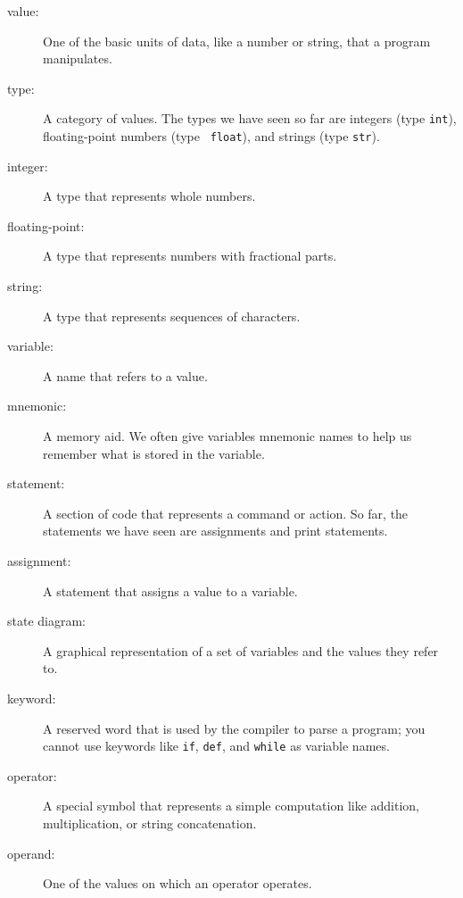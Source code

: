 \documentclass[10pt]{book}
\begin{document}
\begin{description}

\item[value:]  One of the basic units of data, like a number or string, 
that a program manipulates.

\item[type:] A category of values.  The types we have seen so far
are integers (type {\tt int}), floating-point numbers (type {\tt
float}), and strings (type {\tt str}).

\item[integer:] A type that represents whole numbers.

\item[floating-point:] A type that represents numbers with fractional
parts.

\item[string:] A type that represents sequences of characters.

\item[variable:]  A name that refers to a value.

\item[mnemonic:] A memory aid. We often give variables mnemonic names
to help us remember what is stored in the variable.

\item[statement:]  A section of code that represents a command or action.  So
far, the statements we have seen are assignments and print statements.

\item[assignment:]  A statement that assigns a value to a variable.

\item[state diagram:]  A graphical representation of a set of variables and the
values they refer to.

\item[keyword:]  A reserved word that is used by the compiler to parse a
program; you cannot use keywords like {\tt if}, {\tt  def}, and {\tt while} as
variable names.

\item[operator:]  A special symbol that represents a simple computation like
addition, multiplication, or string concatenation.

\item[operand:]  One of the values on which an operator operates.


\end{description}
\end{document}

